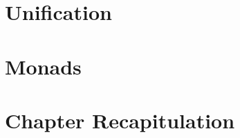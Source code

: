 \documentclass[thesis-solanki.tex]{subfiles}
\begin{document}


\section{Unification}



\section{ Monads}





\section{Chapter Recapitulation}

\ifMain
\begin{scope}
  \nolinenumbers
  \enotesize
  \par
  \begin{singlespace}
  \setlength{\parskip}{12pt plus 2pt minus 1pt}
  \theendnotes
  \par
  \end{singlespace}
\end{scope}
\fi
\end{document}
